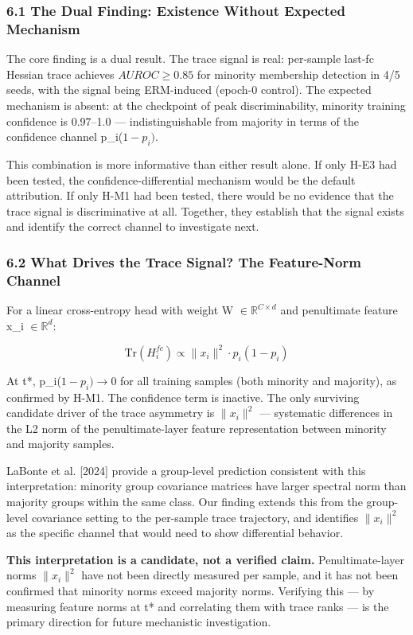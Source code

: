 
\subsubsection{6.1 The Dual Finding: Existence Without Expected Mechanism}

The core finding is a dual result. The trace signal is real: per-sample last-fc Hessian trace achieves $AUROC\geq 0.85$ for minority membership detection in 4/5 seeds, with the signal being ERM-induced (epoch-0 control). The expected mechanism is absent: at the checkpoint of peak discriminability, minority training confidence is 0.97--1.0 --- indistinguishable from majority in terms of the confidence channel p\_i($1-p_{i})$.

This combination is more informative than either result alone. If only H-E3 had been tested, the confidence-differential mechanism would be the default attribution. If only H-M1 had been tested, there would be no evidence that the trace signal is discriminative at all. Together, they establish that the signal exists and identify the correct channel to investigate next.

\subsubsection{6.2 What Drives the Trace Signal? The Feature-Norm Channel}

For a linear cross-entropy head with weight W $\in \mathbb{R}^{C\times d}$ and penultimate feature x\_i $\in \mathbb{R}^d$:

$$\mathrm{Tr}(H_i^{fc}) \propto \|x_i\|^2 \cdot p_i(1 - p_i)$$

At t*, p\_i($1-p_{i})\rightarrow 0$ for all training samples (both minority and majority), as confirmed by H-M1. The confidence term is inactive. The only surviving candidate driver of the trace asymmetry is $\|x_{i}\|^2$ --- systematic differences in the L2 norm of the penultimate-layer feature representation between minority and majority samples.

LaBonte et al. [2024] provide a group-level prediction consistent with this interpretation: minority group covariance matrices have larger spectral norm than majority groups within the same class. Our finding extends this from the group-level covariance setting to the per-sample trace trajectory, and identifies $\|x_{i}\|^2$ as the specific channel that would need to show differential behavior.

\textbf{This interpretation is a candidate, not a verified claim.} Penultimate-layer norms $\|x_{i}\|^2$ have not been directly measured per sample, and it has not been confirmed that minority norms exceed majority norms. Verifying this --- by measuring feature norms at t* and correlating them with trace ranks --- is the primary direction for future mechanistic investigation.

